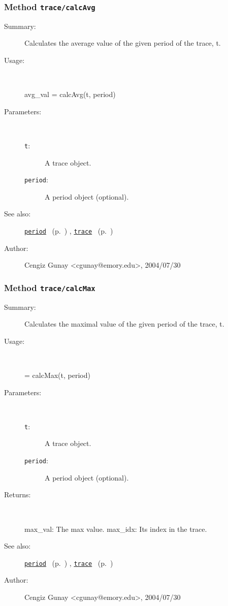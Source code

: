 \subsubsection[Method \texttt{calcAvg}]{Method \texttt{trace/calcAvg}}%
%
\label{ref_trace__calcAvg}%
\hypertarget{ref_trace__calcAvg}{}%
\begin{description}
\item[Summary:]Calculates the average value of the given period 
 		of the trace, t. 
%
\item[Usage:]~%
\begin{lyxcode}%
avg\_val = calcAvg(t, period)
%
\end{lyxcode}%
%
%
\item[Parameters:]~
\begin{description}%
\item[\texttt{t}:]
 A trace object.
\item[\texttt{period}:]
 A period object (optional).
\end{description}%
%
%
%
\item[See also:]%
\hyperlink{ref_period}{\texttt{period}}%
\ (p.~\pageref{ref_period})%
%
, \hyperlink{ref_trace}{\texttt{trace}}%
\ (p.~\pageref{ref_trace})%
%
%
\item[Author:]%
Cengiz Gunay <cgunay@emory.edu>, 2004/07/30
%
\end{description}
\methodline%
\subsubsection[Method \texttt{calcMax}]{Method \texttt{trace/calcMax}}%
%
\label{ref_trace__calcMax}%
\hypertarget{ref_trace__calcMax}{}%
\begin{description}
\item[Summary:]Calculates the maximal value of the given period 
 		of the trace, t. 
%
\item[Usage:]~%
\begin{lyxcode}%
[max\_val, max\_idx] = calcMax(t, period)
%
\end{lyxcode}%
%
%
\item[Parameters:]~
\begin{description}%
\item[\texttt{t}:]
 A trace object.
\item[\texttt{period}:]
 A period object (optional).
\end{description}%
%
\item[Returns:
]~

	max\_val: The max value.
	max\_idx: Its index in the trace.
%
%
\item[See also:]%
\hyperlink{ref_period}{\texttt{period}}%
\ (p.~\pageref{ref_period})%
%
, \hyperlink{ref_trace}{\texttt{trace}}%
\ (p.~\pageref{ref_trace})%
%
%
\item[Author:]%
Cengiz Gunay <cgunay@emory.edu>, 2004/07/30
%
\end{description}
\methodline%
